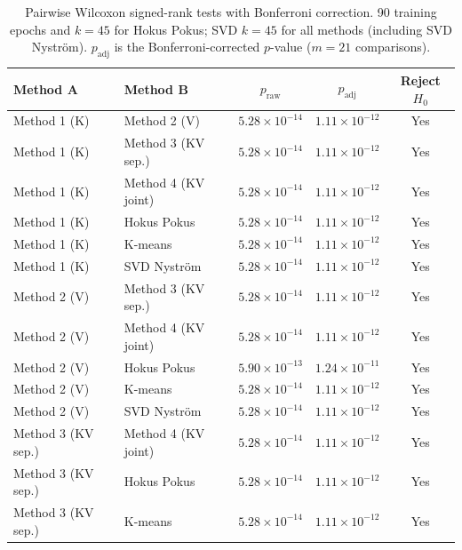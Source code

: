 \begin{table}[H]
\centering
\caption{Pairwise Wilcoxon signed-rank tests with Bonferroni correction.
90 training epochs and $k=45$ for Hokus Pokus; SVD $k=45$ for all methods (including SVD Nyström).
$p_\text{adj}$ is the Bonferroni-corrected $p$-value ($m=21$ comparisons).}
\label{tab:stat_tests_k45}
\begin{tabular}{ll cc c}
\toprule
Method A & Method B & $p_\text{raw}$ & $p_\text{adj}$ & Reject $H_0$ \\
\midrule
Method 1 (K)      & Method 2 (V)         & $5.28 \times 10^{-14}$ & $1.11 \times 10^{-12}$ & Yes \\
Method 1 (K)      & Method 3 (KV sep.)   & $5.28 \times 10^{-14}$ & $1.11 \times 10^{-12}$ & Yes \\
Method 1 (K)      & Method 4 (KV joint)  & $5.28 \times 10^{-14}$ & $1.11 \times 10^{-12}$ & Yes \\
Method 1 (K)      & Hokus Pokus          & $5.28 \times 10^{-14}$ & $1.11 \times 10^{-12}$ & Yes \\
Method 1 (K)      & K-means              & $5.28 \times 10^{-14}$ & $1.11 \times 10^{-12}$ & Yes \\
Method 1 (K)      & SVD Nyström          & $5.28 \times 10^{-14}$ & $1.11 \times 10^{-12}$ & Yes \\
\addlinespace
Method 2 (V)      & Method 3 (KV sep.)   & $5.28 \times 10^{-14}$ & $1.11 \times 10^{-12}$ & Yes \\
Method 2 (V)      & Method 4 (KV joint)  & $5.28 \times 10^{-14}$ & $1.11 \times 10^{-12}$ & Yes \\
Method 2 (V)      & Hokus Pokus          & $5.90 \times 10^{-13}$ & $1.24 \times 10^{-11}$ & Yes \\
Method 2 (V)      & K-means              & $5.28 \times 10^{-14}$ & $1.11 \times 10^{-12}$ & Yes \\
Method 2 (V)      & SVD Nyström          & $5.28 \times 10^{-14}$ & $1.11 \times 10^{-12}$ & Yes \\
\addlinespace
Method 3 (KV sep.) & Method 4 (KV joint) & $5.28 \times 10^{-14}$ & $1.11 \times 10^{-12}$ & Yes \\
Method 3 (KV sep.) & Hokus Pokus         & $5.28 \times 10^{-14}$ & $1.11 \times 10^{-12}$ & Yes \\
Method 3 (KV sep.) & K-means             & $5.28 \times 10^{-14}$ & $1.11 \times 10^{-12}$ & Yes \\

\end{tabular}
\end{table}
